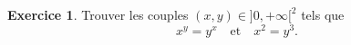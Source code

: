 \documentclass[a4paper, 11pt,openany]{article}%
\theoremstyle{plain}
\theoremstyle{definition}
\newtheorem{exo}{Exercice}
\newtheorem{sol}{Solution de l'exercice}
\theoremstyle{remark}
\begin{document}
%
%        

\begin{exo}
Trouver les couples $(x,y) \in ]0,+\infty[^2$ tels que
\[ x^y = y^x \quad \text{et} \quad x^2 = y^3.\]
\end{exo}

\end{document}
